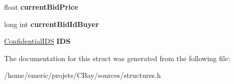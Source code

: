 \begin{DoxyCompactItemize}
\item 
\hypertarget{struct_object_bid_a8864df4945a55f29bb320025d6011cc1}{float {\bfseries current\-Bid\-Price}}\label{struct_object_bid_a8864df4945a55f29bb320025d6011cc1}

\item 
\hypertarget{struct_object_bid_aa79adfae7ada9530c98f5510fc34a0f7}{long int {\bfseries current\-Bid\-Id\-Buyer}}\label{struct_object_bid_aa79adfae7ada9530c98f5510fc34a0f7}

\item 
\hypertarget{struct_object_bid_a588d1e5ad85c65bc2b00e9432faadc0e}{\hyperlink{struct_confidential_i_d_s}{Confidential\-I\-D\-S} {\bfseries I\-D\-S}}\label{struct_object_bid_a588d1e5ad85c65bc2b00e9432faadc0e}

\end{DoxyCompactItemize}


The documentation for this struct was generated from the following file\-:\begin{DoxyCompactItemize}
\item 
/home/emeric/projets/\-C\-Bay/sources/structures.\-h\end{DoxyCompactItemize}
